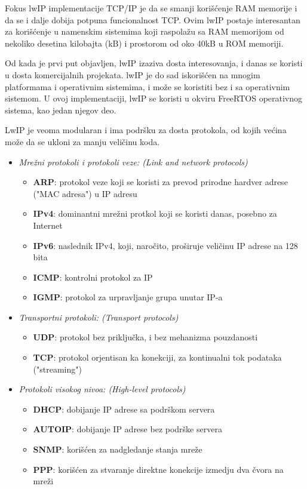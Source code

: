 \documentclass[a4paper,12pt, master]{etf}
\begin{document}
	Fokus lwIP implementacije TCP/IP je da se smanji kori\v{s}\'{c}enje RAM memorije i da se i dalje 
	dobija potpuna funcionalnost TCP. Ovim lwIP postaje interesantan za kori\v{s}\'{c}enje u namenskim 
	sistemima koji raspola\v{z}u sa RAM memorijom od nekoliko desetina kilobajta (kB) i prostorom od 
	oko 40kB u ROM memoriji.

	Od kada je prvi put objavljen, lwIP izaziva dosta interesovanja, i danas se koristi u dosta
	komercijalnih projekata. lwIP je do sad iskori\v{s}\'{c}en na mnogim platformama i operativnim
	sistemima, i mo\v{z}e se koristiti bez i sa operativnim sistemom. U ovoj implementaciji, lwIP 
	se koristi u okviru FreeRTOS operativnog sistema, kao jedan njegov deo.

	LwIP je veoma modularan i ima podr\v{s}ku za dosta protokola, od kojih ve\'{c}ina mo\v{z}e da se 
	ukloni za manju veli\v{c}inu koda.
	\begin{itemize}
		\item \textit{Mre\v{z}ni protokoli i protokoli veze: (Link and network protocols)}
		\begin{itemize}
			\item \textbf{ARP}: protokol veze koji se koristi za prevod prirodne hardver adrese
			("MAC adresa") u IP adresu
			\item \textbf{IPv4}: dominantni mre\v{z}ni protkol koji se koristi danas, posebno za
			Internet
			\item \textbf{IPv6}: naslednik IPv4, koji, naro\v{c}ito, pro\v{s}iruje veli\v{c}inu IP adrese 
			na 128 bita
			\item \textbf{ICMP}: kontrolni protokol za IP
			\item \textbf{IGMP}: protokol za urpravljanje grupa unutar IP-a
		\end{itemize}
		\item \textit{Transportni protokoli: (Transport protocols)}
			\begin{itemize}
				\item \textbf{UDP}: protokol bez priklju\v{c}ka, i bez mehanizma pouzdanosti
				\item \textbf{TCP}: protokol orjentisan ka konekciji, za kontinualni tok 
				podataka ("streaming")
			\end{itemize}
		\item \textit{Protokoli visokog nivoa: (High-level protocols)}
			\begin{itemize}
				\item \textbf{DHCP}: dobijanje IP adrese sa podr\v{s}kom servera
				\item \textbf{AUTOIP}: dobijanje IP adrese bez podr\v{s}ke servera
				\item \textbf{SNMP}: kori\v{s}\'{c}en za nadgledanje stanja mre\v{z}e
				\item \textbf{PPP}: kori\v{s}\'{c}en za stvaranje direktne konekcije izmedju dva \v{c}vora 
				na mre\v{z}i
			\end{itemize}
	\end{itemize}
\end{document}
